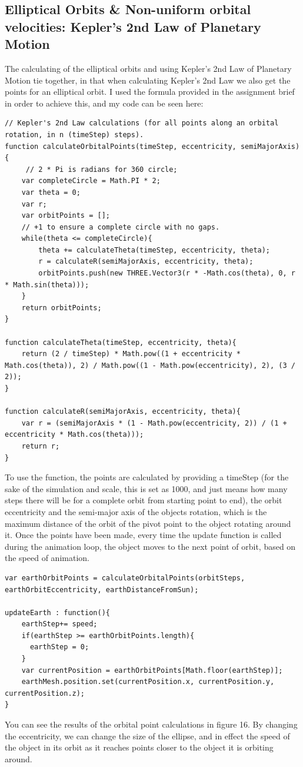 \documentclass[12pt]{article}
\begin{document}
\subsection{Elliptical Orbits \& Non-uniform orbital velocities: Kepler's 2nd Law of Planetary Motion}
The calculating of the elliptical orbits and using Kepler's 2nd Law of Planetary Motion tie together, in that when calculating Kepler's 2nd Law we also get the points for an elliptical orbit. I used the formula provided in the assignment brief \cite{assignment} in order to achieve this, and my code can be seen here:
\begin{lstlisting}
// Kepler's 2nd Law calculations (for all points along an orbital rotation, in n (timeStep) steps).
function calculateOrbitalPoints(timeStep, eccentricity, semiMajorAxis){
	 // 2 * Pi is radians for 360 circle;
	var completeCircle = Math.PI * 2;
	var theta = 0;
	var r;
	var orbitPoints = [];
	// +1 to ensure a complete circle with no gaps.
	while(theta <= completeCircle){
		theta += calculateTheta(timeStep, eccentricity, theta);
		r = calculateR(semiMajorAxis, eccentricity, theta);
		orbitPoints.push(new THREE.Vector3(r * -Math.cos(theta), 0, r * Math.sin(theta)));
	}
	return orbitPoints;
}

function calculateTheta(timeStep, eccentricity, theta){
	return (2 / timeStep) * Math.pow((1 + eccentricity * Math.cos(theta)), 2) / Math.pow((1 - Math.pow(eccentricity), 2), (3 / 2));
}

function calculateR(semiMajorAxis, eccentricity, theta){
	var r = (semiMajorAxis * (1 - Math.pow(eccentricity, 2)) / (1 + eccentricity * Math.cos(theta)));
	return r;
}
\end{lstlisting}

To use the function, the points are calculated by providing a timeStep (for the sake of the simulation and scale, this is set as 1000, and just means how many steps there will be for a complete orbit from starting point to end), the orbit eccentricity and the semi-major axis of the objects rotation, which is the maximum distance of the orbit of the pivot point to the object rotating around it. Once the points have been made, every time the update function is called during the animation loop, the object moves to the next point of orbit, based on the speed of animation.

\begin{lstlisting}
var earthOrbitPoints = calculateOrbitalPoints(orbitSteps, earthOrbitEccentricity, earthDistanceFromSun);

updateEarth : function(){
    earthStep+= speed;
    if(earthStep >= earthOrbitPoints.length){
      earthStep = 0;
    }
    var currentPosition = earthOrbitPoints[Math.floor(earthStep)];
    earthMesh.position.set(currentPosition.x, currentPosition.y, currentPosition.z);
}
\end{lstlisting}
You can see the results of the orbital point calculations in figure 16. By changing the eccentricity, we can change the size of the ellipse, and in effect the speed of the object in its orbit as it reaches points closer to the object it is orbiting around.
\end{document}
